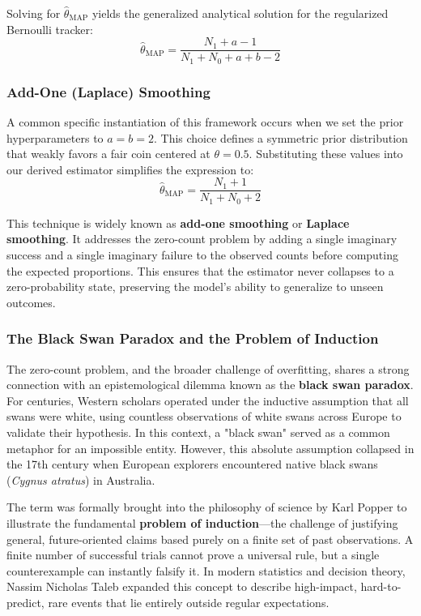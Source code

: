 \documentclass{article}
\begin{document}
Solving for $\hat{\theta}_{\text{MAP}}$ yields the generalized analytical solution for the regularized Bernoulli tracker:
\begin{equation}
\hat{\theta}_{\text{MAP}} = \frac{N_1 + a - 1}{N_1 + N_0 + a + b - 2}
\end{equation}

\subsubsection{Add-One (Laplace) Smoothing}

A common specific instantiation of this framework occurs when we set the prior hyperparameters to $a = b = 2$. This choice defines a symmetric prior distribution that weakly favors a fair coin centered at $\theta = 0.5$. Substituting these values into our derived estimator simplifies the expression to:
\begin{equation}
\hat{\theta}_{\text{MAP}} = \frac{N_1 + 1}{N_1 + N_0 + 2}
\end{equation}

This technique is widely known as \textbf{add-one smoothing} or \textbf{Laplace smoothing}. It addresses the zero-count problem by adding a single imaginary success and a single imaginary failure to the observed counts before computing the expected proportions. This ensures that the estimator never collapses to a zero-probability state, preserving the model's ability to generalize to unseen outcomes.

\subsubsection{The Black Swan Paradox and the Problem of Induction}

The zero-count problem, and the broader challenge of overfitting, shares a strong connection with an epistemological dilemma known as the \textbf{black swan paradox}. For centuries, Western scholars operated under the inductive assumption that all swans were white, using countless observations of white swans across Europe to validate their hypothesis. In this context, a "black swan" served as a common metaphor for an impossible entity. However, this absolute assumption collapsed in the 17th century when European explorers encountered native black swans (\textit{Cygnus atratus}) in Australia.

The term was formally brought into the philosophy of science by Karl Popper to illustrate the fundamental \textbf{problem of induction}—the challenge of justifying general, future-oriented claims based purely on a finite set of past observations. A finite number of successful trials cannot prove a universal rule, but a single counterexample can instantly falsify it. In modern statistics and decision theory, Nassim Nicholas Taleb expanded this concept to describe high-impact, hard-to-predict, rare events that lie entirely outside regular expectations.
\end{document}

